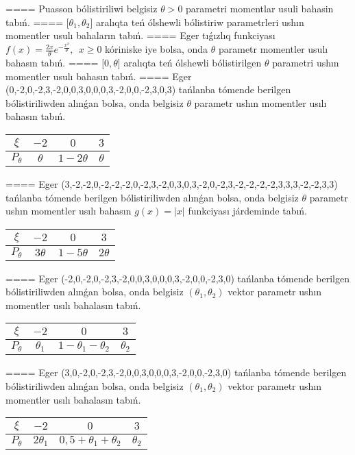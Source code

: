 ====
Puasson bólistiriliwi belgisiz \(\theta > 0\) parametri momentlar usuli bahasin tabıń.
====
\(\lbrack\theta_{1},\theta_{2}\rbrack\) aralıqta teń ólshewli bólistiriw parametrleri ushın momentler usulı bahaların tabıń.
====
Eger tıǵızlıq funkciyası \(f(x) = \frac{2x}{\theta}e^{- \frac{x^{2}}{\theta}},\ \ x \geq 0\) kóriniske iye bolsa, onda \(\theta\) parametr momentler usulı bahasın tabıń.
====
\(\lbrack 0,\theta\rbrack\) aralıqta teń ólshewli bólistirilgen \(\theta\) parametri ushın momentler usulı bahasın tabıń.
====
Eger (0,-2,0,-2,3,-2,0,0,3,0,0,0,3,-2,0,0,-2,3,0,3) tańlanba tómende berilgen bólistiriliwden alınǵan bolsa, onda belgisiz \(\theta\) parametr ushın momentler usılı bahasın tabıń.
\begin{tabular}{|c|c|c|c|}
  \hline
$\xi$ & $- 2$  & $0$  & $3$ \\
\hline
\(P_{\theta}\) & \(\theta\) & \(1 - 2\theta\) & \(\theta\) \\
\hline
\end{tabular}
====
Eger (3,-2,-2,0,-2,-2,-2,0,-2,3,-2,0,3,0,3,-2,0,-2,3,-2,-2,-2,-2,3,3,3,-2,-2,3,3) tańlanba tómende berilgen bólistiriliwden alınǵan bolsa, onda belgisiz \(\theta\) parametr ushın momentler usılı bahasın \(g(x) = |x|\) funkciyası járdeminde tabıń.
\begin{tabular}{|c|c|c|c|}
  \hline
$\xi$ &
$- 2$ &
$0$ &
$3$ \\
\hline
\(P_{\theta}\) & \(3\theta\) & \(1 - 5\theta\) & \(2\theta\) \\
\hline
\end{tabular}
====
Eger (-2,0,-2,0,-2,3,-2,0,0,3,0,0,0,3,-2,0,0,-2,3,0) tańlanba tómende berilgen bólistiriliwden alınǵan bolsa, onda belgisiz \(\left( \theta_{1},\theta_{2} \right)\) vektor parametr ushın momentler usılı bahalasın tabıń.
\begin{tabular}{|c|c|c|c|}
  \hline
$\xi$ &
$- 2$ &
$0$ &
$3$\\
\hline
\(P_{\theta}\) & \(\theta_{1}\) & \(1 - \theta_{1} - \theta_{2}\) & \(\theta_{2}\) \\
\hline
\end{tabular}
====
Eger (3,0,-2,0,-2,3,-2,0,0,3,0,0,0,3,-2,0,0,-2,3,0) tańlanba tómende berilgen bólistiriliwden alınǵan bolsa, onda belgisiz \(\left( \theta_{1},\theta_{2} \right)\) vektor parametr ushın momentler usılı bahalasın tabıń.
\begin{tabular}{|c|c|c|c|}
  \hline
$\xi$ &
$- 2$ &
$0$ &
$3$\\
\hline
\(P_{\theta}\) & \({2\theta}_{1}\) & \(0,5 + \theta_{1} + \theta_{2}\) & \(\theta_{2}\) \\
\hline
\end{tabular}
